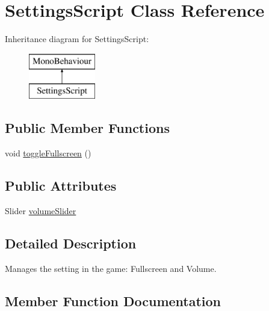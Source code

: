 \hypertarget{class_settings_script}{}\section{Settings\+Script Class Reference}
\label{class_settings_script}
Inheritance diagram for Settings\+Script\+:\begin{figure}[H]
\begin{center}
\leavevmode
\includegraphics[height=2.000000cm]{class_settings_script}
\end{center}
\end{figure}
\subsection*{Public Member Functions}
\begin{DoxyCompactItemize}
\item 
void \hyperlink{class_settings_script_a180f9bd5c3489838bf85b8d7e6377b53}{toggle\+Fullscreen} ()
\end{DoxyCompactItemize}
\subsection*{Public Attributes}
\begin{DoxyCompactItemize}
\item 
Slider \hyperlink{class_settings_script_ad08bdea1b11fad7c975f6ec3449c575a}{volume\+Slider}
\end{DoxyCompactItemize}


\subsection{Detailed Description}
Manages the setting in the game\+: Fullscreen and Volume. 

\subsection{Member Function Documentation}
\mbox{\label{class_settings_script_a180f9bd5c3489838bf85b8d7e6377b53}} 
